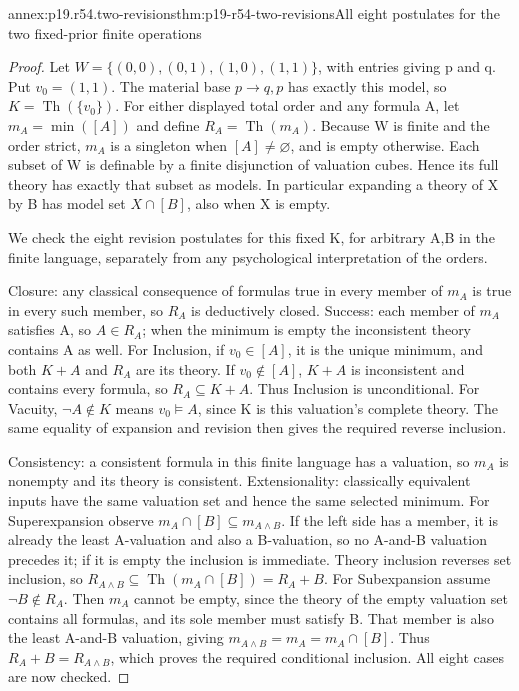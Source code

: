 \begin{annexitem}{annex:p19.r54.two-revisions}{thm:p19-r54-two-revisions}{All eight postulates for the two fixed-prior finite operations}
\begin{proof}
Let \(W=\{(0,0),(0,1),(1,0),(1,1)\}\), with entries
giving p and q. Put \(v_0=(1,1)\). The material base
\(p\to q,p\) has exactly this model, so
\(K=\operatorname{Th}(\{v_0\})\).
For either displayed total order and any formula A, let
\(m_A=\min([A])\) and define \(R_A=\operatorname{Th}(m_A)\).
Because W is finite and the order strict, \(m_A\) is a
singleton when \([A]\ne\varnothing\), and is empty otherwise.
Each subset of W is definable by a finite disjunction of
valuation cubes. Hence its full theory has exactly that subset
as models. In particular expanding a theory of X by B has
model set \(X\cap[B]\), also when X is empty.

We check the eight revision postulates for this fixed K,
for arbitrary A,B in the finite language, separately from
any psychological interpretation of the orders.

Closure: any classical consequence of formulas true in every
member of \(m_A\) is true in every such member, so
\(R_A\) is deductively closed. Success: each member of
\(m_A\) satisfies A, so \(A\in R_A\); when the minimum
is empty the inconsistent theory contains A as well.
For Inclusion, if \(v_0\in[A]\), it is the unique minimum,
and both \(K+A\) and \(R_A\) are its theory. If
\(v_0\notin[A]\), \(K+A\) is inconsistent and contains
every formula, so \(R_A\subseteq K+A\). Thus Inclusion
is unconditional. For Vacuity, \(\neg A\notin K\)
means \(v_0\models A\), since K is this valuation's
complete theory. The same equality of expansion and revision
then gives the required reverse inclusion.

Consistency: a consistent formula in this finite language has
a valuation, so \(m_A\) is nonempty and its theory is
consistent. Extensionality: classically equivalent inputs have
the same valuation set and hence the same selected minimum.
For Superexpansion observe
\(m_A\cap[B]\subseteq m_{A\land B}\).
If the left side has a member, it is already the least
A-valuation and also a B-valuation, so no A-and-B valuation
precedes it; if it is empty the inclusion is immediate.
Theory inclusion reverses set inclusion, so
\(R_{A\land B}\subseteq\operatorname{Th}(m_A\cap[B])
=R_A+B\).
For Subexpansion assume \(\neg B\notin R_A\).
Then \(m_A\) cannot be empty, since the theory of the empty
valuation set contains all formulas, and its sole member must satisfy B. That
member is also the least A-and-B valuation, giving
\(m_{A\land B}=m_A=m_A\cap[B]\).
Thus \(R_A+B=R_{A\land B}\), which proves the required
conditional inclusion. All eight cases are now checked.


\end{proof}
\end{annexitem}
